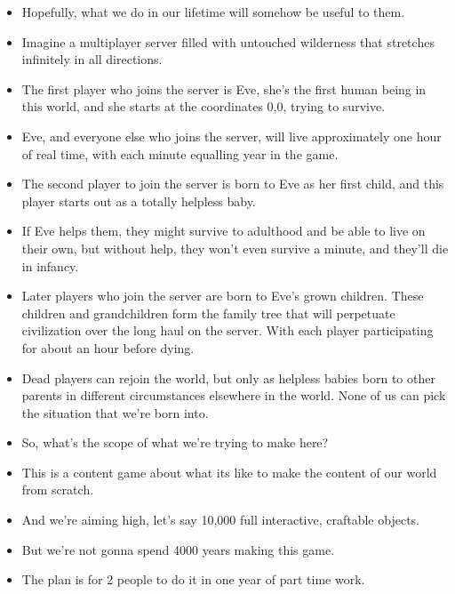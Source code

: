 \documentclass[12pt]{article}
\begin{document}
{\begin{itemize}
\item Hopefully, what we do in our lifetime will somehow be useful to them.

\item Imagine a multiplayer server filled with untouched wilderness that stretches infinitely in all directions.

\item The first player who joins the server is Eve, she's the  first human being in this world, and she starts at the coordinates 0,0, trying to survive.

\item Eve, and everyone else who joins the server, will live approximately one hour of real time, with each minute equalling year in the game.

\item The second player to join the server is born to Eve as her first child, and this player starts out as a totally helpless baby.

\item If Eve helps them, they might survive to adulthood and be able to live on their own, but without help, they won't even survive a minute, and they'll die in infancy.

\item Later players who join the server are born to Eve's grown children.  These children and grandchildren form the family tree that will perpetuate civilization over the long haul on the server.  With each player participating for about an hour before dying.

\item Dead players can rejoin the world, but only as helpless babies born to other parents in different circumstances elsewhere in the world.  None of us can pick the situation that we're born into.


\item So, what's the scope of what we're trying to make here?

\item This is a content game about what its like to make the content of our world from scratch.

\item And we're aiming high, let's say 10,000 full interactive, craftable objects.

\item But we're not gonna spend 4000 years making this game.

\item The plan is for 2 people to do it in one year of part time work.


\end{itemize}}
\end{document}
